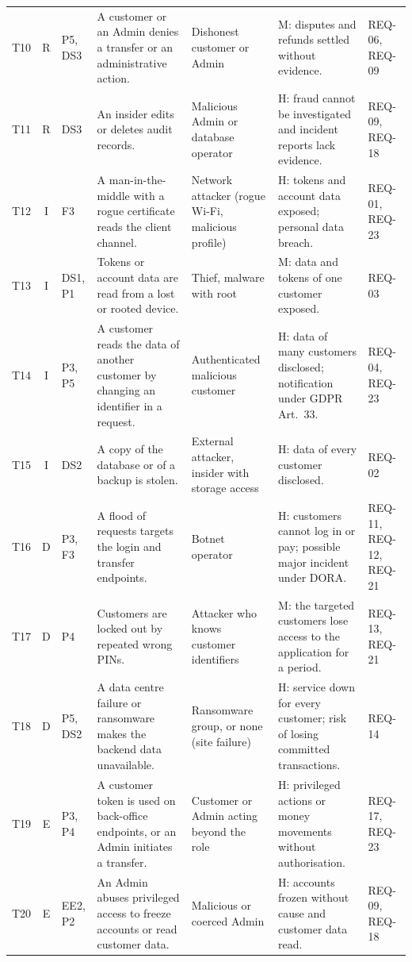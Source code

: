 \begin{table}[!h]
\begin{tabularx}{\textwidth}{@{}L{0.55cm}c@{\hspace{5pt}}L{1.1cm}YL{2.5cm}L{4.1cm}L{2.15cm}@{}}
T10 & R & P5, DS3 & A customer or an Admin denies a transfer or an administrative action. & Dishonest customer or Admin & M: disputes and refunds settled without evidence. & REQ-06, REQ-09 \\
T11 & R & DS3 & An insider edits or deletes audit records. & Malicious Admin or database operator & H: fraud cannot be investigated and incident reports lack evidence. & REQ-09, REQ-18 \\
T12 & I & F3 & A man-in-the-middle with a rogue certificate reads the client channel. & Network attacker (rogue Wi-Fi, malicious profile) & H: tokens and account data exposed; personal data breach. & REQ-01, REQ-23 \\
T13 & I & DS1, P1 & Tokens or account data are read from a lost or rooted device. & Thief, malware with root & M: data and tokens of one customer exposed. & REQ-03 \\
T14 & I & P3, P5 & A customer reads the data of another customer by changing an identifier in a request. & Authenticated malicious customer & H: data of many customers disclosed; notification under \ac{GDPR} Art.~33. & REQ-04, REQ-23 \\
T15 & I & DS2 & A copy of the database or of a backup is stolen. & External attacker, insider with storage access & H: data of every customer disclosed. & REQ-02 \\
T16 & D & P3, F3 & A flood of requests targets the login and transfer endpoints. & Botnet operator & H: customers cannot log in or pay; possible major incident under \ac{DORA}. & REQ-11, REQ-12, REQ-21 \\
T17 & D & P4 & Customers are locked out by repeated wrong \acp{PIN}. & Attacker who knows customer identifiers & M: the targeted customers lose access to the application for a period. & REQ-13, REQ-21 \\
T18 & D & P5, DS2 & A data centre failure or ransomware makes the backend data unavailable. & Ransomware group, or none (site failure) & H: service down for every customer; risk of losing committed transactions. & REQ-14 \\
T19 & E & P3, P4 & A customer token is used on back-office endpoints, or an Admin initiates a transfer. & Customer or Admin acting beyond the role & H: privileged actions or money movements without authorisation. & REQ-17, REQ-23 \\
T20 & E & EE2, P2 & An Admin abuses privileged access to freeze accounts or read customer data. & Malicious or coerced Admin & H: accounts frozen without cause and customer data read. & REQ-09, REQ-18 \\
\bottomrule
\end{tabularx}
\end{table}

